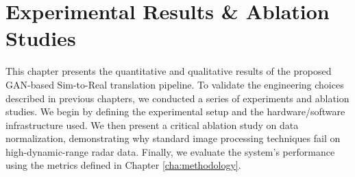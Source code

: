 \chapter{Experimental Results \& Ablation Studies}
\label{cha:experimental_results}

This chapter presents the quantitative and qualitative results of the proposed GAN-based Sim-to-Real translation pipeline.
To validate the engineering choices described in previous chapters, we conducted a series of experiments and ablation studies.
We begin by defining the experimental setup and the hardware/software infrastructure used.
We then present a critical ablation study on data normalization, demonstrating why standard image processing techniques fail on high-dynamic-range radar data.
Finally, we evaluate the system's performance using the metrics defined in Chapter \ref{cha:methodology}.



